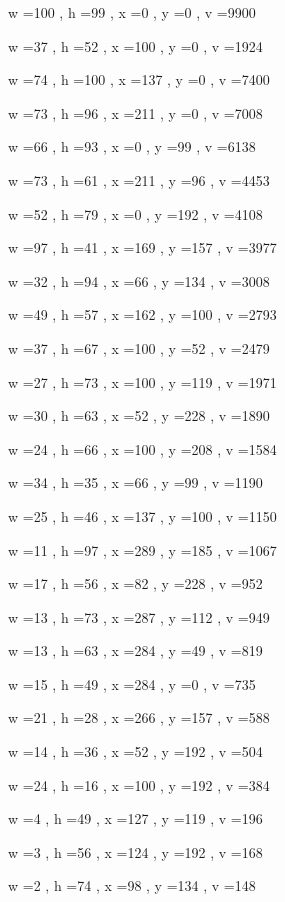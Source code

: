 \documentclass[11pt]{article}
\begin{document}
w =100 , h =99 , x =0 , y =0 , v =9900
\par
w =37 , h =52 , x =100 , y =0 , v =1924
\par
w =74 , h =100 , x =137 , y =0 , v =7400
\par
w =73 , h =96 , x =211 , y =0 , v =7008
\par
w =66 , h =93 , x =0 , y =99 , v =6138
\par
w =73 , h =61 , x =211 , y =96 , v =4453
\par
w =52 , h =79 , x =0 , y =192 , v =4108
\par
w =97 , h =41 , x =169 , y =157 , v =3977
\par
w =32 , h =94 , x =66 , y =134 , v =3008
\par
w =49 , h =57 , x =162 , y =100 , v =2793
\par
w =37 , h =67 , x =100 , y =52 , v =2479
\par
w =27 , h =73 , x =100 , y =119 , v =1971
\par
w =30 , h =63 , x =52 , y =228 , v =1890
\par
w =24 , h =66 , x =100 , y =208 , v =1584
\par
w =34 , h =35 , x =66 , y =99 , v =1190
\par
w =25 , h =46 , x =137 , y =100 , v =1150
\par
w =11 , h =97 , x =289 , y =185 , v =1067
\par
w =17 , h =56 , x =82 , y =228 , v =952
\par
w =13 , h =73 , x =287 , y =112 , v =949
\par
w =13 , h =63 , x =284 , y =49 , v =819
\par
w =15 , h =49 , x =284 , y =0 , v =735
\par
w =21 , h =28 , x =266 , y =157 , v =588
\par
w =14 , h =36 , x =52 , y =192 , v =504
\par
w =24 , h =16 , x =100 , y =192 , v =384
\par
w =4 , h =49 , x =127 , y =119 , v =196
\par
w =3 , h =56 , x =124 , y =192 , v =168
\par
w =2 , h =74 , x =98 , y =134 , v =148
\par
\newpage
\end{document}
